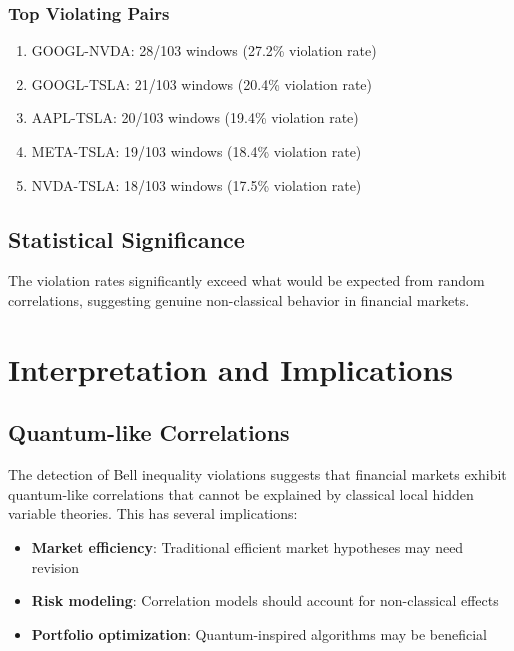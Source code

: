 \documentclass[11pt,a4paper]{article}
\begin{document}
\subsubsection{Top Violating Pairs}

\begin{enumerate}
    \item GOOGL-NVDA: 28/103 windows (27.2\% violation rate)
    \item GOOGL-TSLA: 21/103 windows (20.4\% violation rate)
    \item AAPL-TSLA: 20/103 windows (19.4\% violation rate)
    \item META-TSLA: 19/103 windows (18.4\% violation rate)
    \item NVDA-TSLA: 18/103 windows (17.5\% violation rate)
\end{enumerate}

\subsection{Statistical Significance}

The violation rates significantly exceed what would be expected from random correlations, suggesting genuine non-classical behavior in financial markets.

\section{Interpretation and Implications}

\subsection{Quantum-like Correlations}

The detection of Bell inequality violations suggests that financial markets exhibit quantum-like correlations that cannot be explained by classical local hidden variable theories. This has several implications:

\begin{itemize}
    \item \textbf{Market efficiency}: Traditional efficient market hypotheses may need revision
    \item \textbf{Risk modeling}: Correlation models should account for non-classical effects
    \item \textbf{Portfolio optimization}: Quantum-inspired algorithms may be beneficial
\end{itemize}
\end{document}
